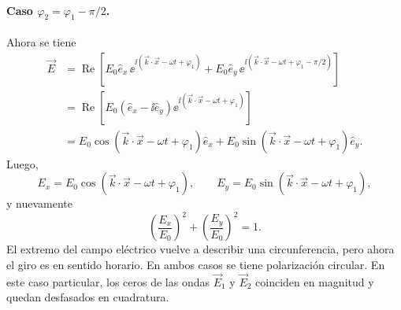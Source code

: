 \documentclass[../main.tex]{subfiles}
\begin{document}
\paragraph{Caso $\varphi_2=\varphi_1-\pi/2$.}
Ahora se tiene
\begin{align*}
    \vec E
    &= \operatorname{Re}\left[E_0\hat e_x\,\ee^{\ii\left(\vec k\cdot\vec x-\omega t+\varphi_1\right)}+E_0\hat e_y\,\ee^{\ii\left(\vec k\cdot\vec x-\omega t+\varphi_1-\pi/2\right)}\right] \\
    &= \operatorname{Re}\left[E_0\left(\hat e_x-\ii\hat e_y\right)\ee^{\ii\left(\vec k\cdot\vec x-\omega t+\varphi_1\right)}\right] \\
    &= E_0\cos\left(\vec k\cdot\vec x-\omega t+\varphi_1\right)\hat e_x+E_0\sin\left(\vec k\cdot\vec x-\omega t+\varphi_1\right)\hat e_y.
\end{align*}
Luego,
\begin{equation*}
    E_x=E_0\cos\left(\vec k\cdot\vec x-\omega t+\varphi_1\right),
    \qquad
    E_y=E_0\sin\left(\vec k\cdot\vec x-\omega t+\varphi_1\right),
\end{equation*}
y nuevamente
\begin{equation*}
    \left(\frac{E_x}{E_0}\right)^2+\left(\frac{E_y}{E_0}\right)^2=1.
\end{equation*}
El extremo del campo eléctrico vuelve a describir una circunferencia, pero ahora el giro es en sentido horario. En ambos casos se tiene polarización circular. En este caso particular, los ceros de las ondas $\vec E_1$ y $\vec E_2$ coinciden en magnitud y quedan desfasados en cuadratura.
\end{document}
